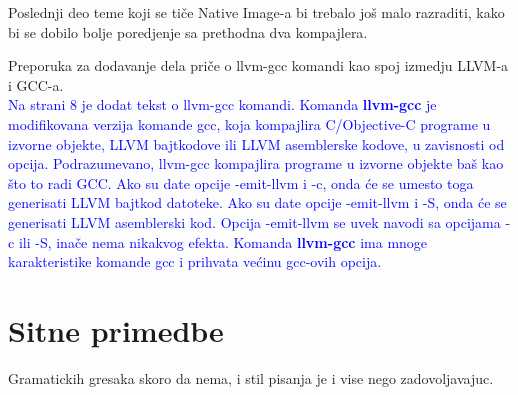 \documentclass[a4paper]{report}
\newcommand{\odgovor}[1]{\textcolor{blue}{#1}}
\begin{document}
Poslednji deo teme koji se tiče Native Image-a bi trebalo još malo razraditi, kako bi se dobilo bolje poredjenje sa prethodna dva kompajlera. 

Preporuka za dodavanje dela priče o llvm-gcc komandi kao spoj izmedju LLVM-a i GCC-a. \\
\odgovor{Na strani 8 je dodat tekst o llvm-gcc komandi. Komanda \textbf{llvm-gcc} je modifikovana verzija komande gcc, koja kompajlira C/Objective-C programe u izvorne objekte, LLVM bajtkodove ili LLVM asemblerske kodove, u zavisnosti od opcija. Podrazumevano, llvm-gcc kompajlira programe u izvorne objekte baš kao što to radi GCC. Ako su date opcije -emit-llvm i -c, onda će se umesto toga generisati LLVM bajtkod datoteke. Ako su date opcije -emit-llvm i -S, onda će se generisati LLVM asemblerski kod. Opcija -emit-llvm se uvek navodi sa opcijama -c ili -S, inače nema nikakvog efekta. Komanda \textbf{llvm-gcc} ima mnoge karakteristike komande gcc i prihvata većinu gcc-ovih opcija.}


\section{Sitne primedbe}
Gramatickih gresaka skoro da nema, i stil pisanja je i vise nego zadovoljavajuc.
\end{document}
